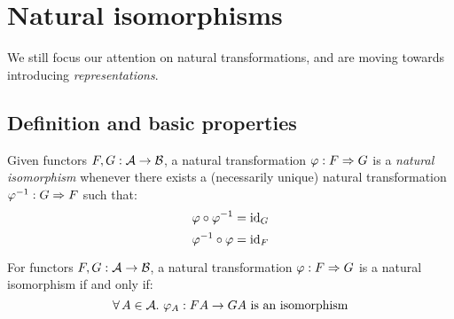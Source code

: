 \chapter{Natural isomorphisms}


We still focus our attention on natural transformations, and are moving
towards introducing \emph{representations}.

\section{Definition and basic properties}

\begin{definition}
Given functors $F, G : \mathcal{A} \to \mathcal{B}$, a natural transformation
$\varphi: F \Rightarrow G$ is a \emph{natural isomorphism} whenever there exists a
(necessarily unique) natural transformation $\varphi^{-1}: G \Rightarrow F$ such
that: 
\[ \varphi \circ \varphi^{-1} = \mathrm{id}_{ G } \]
\[ \varphi^{-1} \circ \varphi = \mathrm{id}_{ F } \]
\end{definition}

\begin{theorem}
For functors $F, G : \mathcal{A} \to \mathcal{B}$, a natural transformation
$\varphi: F \Rightarrow G$ is a natural isomorphism if and only if:
\[ \forall\, A \in \mathcal{A}.\ \text{$\varphi_A: FA \to GA$ is an isomorphism} \]
\end{theorem}

